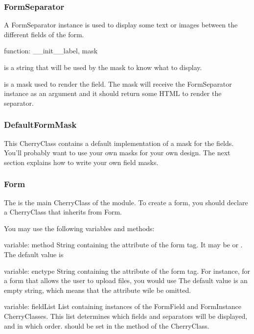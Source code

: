 \subsubsection{FormSeparator}
A FormSeparator instance is used to display some text or images between the different fields of the form.

\begin{funcdesc}{function: __init__}{label, mask}

 is a string that will be used by the mask to know what to display.

 is a mask used to render the field. The mask will receive
the FormSeparator instance as an argument and it should return some HTML to render the separator.
\end{funcdesc}

\subsubsection{DefaultFormMask}
This CherryClass contains a default implementation of a mask for the fields. You'll probably want to use
your own masks for your own design. The next section explains how to write your own field masks.

\subsubsection{Form}

The is the main CherryClass of the module. To create a form, you should declare a CherryClass that inherits from Form.

You may use the following variables and methods:

\begin{memberdesc}{variable: method}
String containing the  attribute of the form tag. It may be  or . The default value
is 
\end{memberdesc}
\begin{memberdesc}{variable: enctype}
String containing the  attribute of the form tag. For instance, for a form that allows the user to upload
files, you would use  The default value is an empty string, which means that the 
attribute wile be omitted.
\end{memberdesc}
\begin{memberdesc}{variable: fieldList}
List containing instances of the FormField and FormInstance CherryClasses. This list determines which fields and
separators will be displayed, and in which order.  should be set in the  method of the
CherryClass.
\end{memberdesc}


